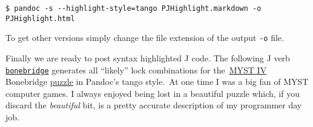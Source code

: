 \footnotesize
\begin{tcolorbox}[breakable, size=fbox, boxrule=1pt, pad at break*=1mm,colback=cellbackground, colframe=cellborder]
\begin{verbatim}
$ pandoc -s --highlight-style=tango PJHighlight.markdown -o PJHighlight.html
\end{verbatim}
\end{tcolorbox}
\normalsize

\noindent To get other versions simply change the file extension of the output
\texttt{-o} file.


Finally we are ready to post syntax highlighted J code. The following J
verb \href{https://github.com/bakerjd99/jacks/blob/master/jodliterate/bonebridge.ijs}{\texttt{bonebridge}} generates 
all ``likely'' lock combinations for
the~\href{http://en.wikipedia.org/wiki/Myst\_IV:\_Revelation}{MYST IV}
Bonebridge
\href{http://www.fisicx.com/revelation/walkthrough.htm}{puzzle} in
Pandoc's tango style.~At one time I was a big fan of MYST computer
games. I always enjoyed being lost in a beautiful puzzle which, if you
discard the \emph{beautiful} bit, is a pretty accurate description of my
programmer day job.

